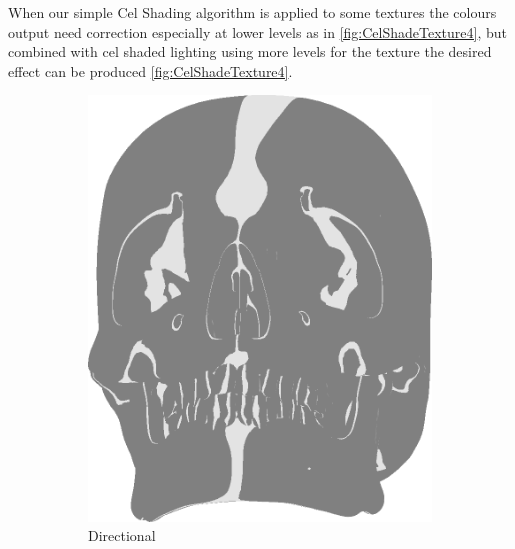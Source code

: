 When our simple Cel Shading algorithm is applied to some textures the colours output need correction especially at lower levels as in \ref{fig:CelShadeTexture4}, but combined with cel shaded lighting using more levels for the texture the desired effect can be produced \ref{fig:CelShadeTexture4}. 

\begin{figure}[h]
\centering
\begin{subfigure}[b]{0.18\textwidth}
        \includegraphics[width=\textwidth]{img/Lighting/Directional.png}
        \caption{Directional}
        \label{fig:LightingPosDir}
\end{subfigure}
    ~
    \begin{subfigure}[b]{0.18\textwidth}

\end{subfigure}
\end{figure}
